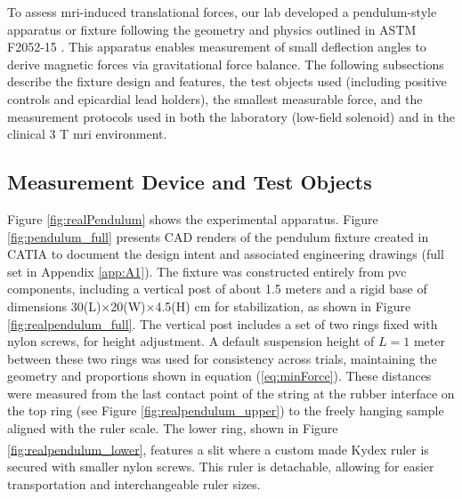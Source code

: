 To assess \gls{mri}-induced translational forces, our lab developed a pendulum-style apparatus or fixture following the geometry and physics outlined in ASTM F2052-15 \cite{astmF2052}. This apparatus enables measurement of small deflection angles to derive magnetic forces via gravitational force balance. The following subsections describe the fixture design and features, the test objects used (including positive controls and epicardial lead holders), the smallest measurable force, and the measurement protocols used in both the laboratory (low-field solenoid) and in the clinical 3 T \gls{mri} environment.

\subsection{Measurement Device and Test Objects}
\label{sec:TransDevice_Testsubjects}

Figure \ref{fig:realPendulum} shows the experimental apparatus. Figure \ref{fig:pendulum_full} presents CAD renders of the pendulum fixture created in CATIA to document the design intent and associated engineering drawings (full set in Appendix \ref{app:A1}). The fixture was constructed entirely from \gls{pvc} components, including a vertical post of about 1.5 meters and a rigid base of dimensions 30(L)$\times$20(W)$\times$4.5(H) cm for stabilization, as shown in Figure \ref{fig:realpendulum_full}. The vertical post includes a set of two rings fixed with nylon screws, for height adjustment. A default suspension height of $L= 1$ meter between these two rings was used for consistency across trials, maintaining the geometry and proportions shown in equation (\ref{eq:minForce}). These distances were measured from the last contact point of the string at the rubber interface on the top ring (see Figure \ref{fig:realpendulum_upper}) to the freely hanging sample aligned with the ruler scale. The lower ring, shown in Figure \ref{fig:realpendulum_lower}, features a slit where a custom made Kydex\textsuperscript{\texttrademark} ruler is secured with smaller nylon screws. This ruler is detachable, allowing for easier transportation and interchangeable ruler sizes.

